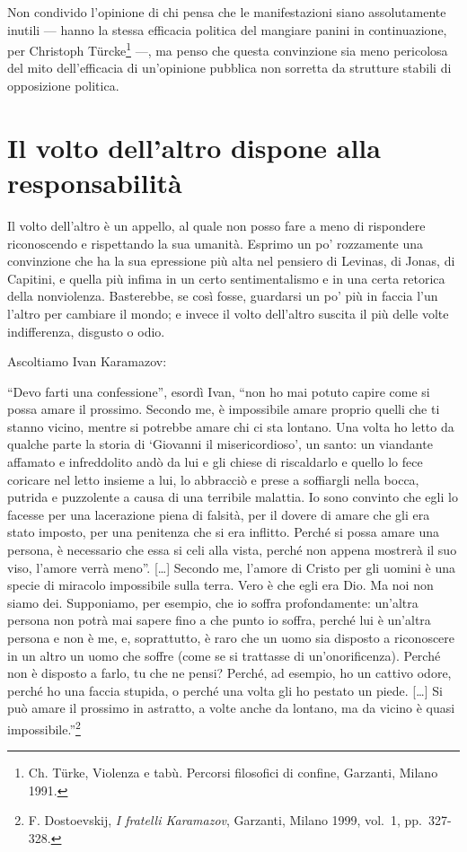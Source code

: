 \documentclass[12pt,oneside,openany]{book}
\begin{document}
Non condivido l'opinione di chi pensa che le manifestazioni siano assolutamente inutili --- hanno la stessa efficacia politica del mangiare panini in continuazione, per Christoph Türcke\footnote{Ch. Türke, Violenza e tabù. Percorsi filosofici di confine, Garzanti, Milano 1991.} ---, ma penso che questa convinzione sia meno pericolosa del mito dell'efficacia di un'opinione pubblica non sorretta da strutture stabili di opposizione politica.

\setcounter{chapter}{10}\addtocounter{chapter}{-1}

\chapter{Il volto dell’altro dispone alla responsabilità}

Il volto dell'altro è un appello, al quale non posso fare a meno di rispondere riconoscendo e rispettando la sua umanità. Esprimo un po' rozzamente una convinzione che ha la sua epressione più alta nel pensiero di Levinas, di Jonas, di Capitini, e quella più infima in un certo sentimentalismo e in una certa retorica della nonviolenza. Basterebbe, se così fosse, guardarsi un po' più in faccia l'un l'altro per cambiare il mondo; e invece il volto dell'altro suscita il più delle volte indifferenza, disgusto o odio.



Ascoltiamo Ivan Karamazov:



``Devo farti una confessione'', esordì Ivan, ``non ho mai potuto capire come si possa amare il prossimo. Secondo me, è impossibile amare proprio quelli che ti stanno vicino, mentre si potrebbe amare chi ci sta lontano. Una volta ho letto da qualche parte la storia di `Giovanni il misericordioso', un santo: un viandante affamato e infreddolito andò da lui e gli chiese di riscaldarlo e quello lo fece coricare nel letto insieme a lui, lo abbracciò e prese a soffiargli nella bocca, putrida e puzzolente a causa di una terribile malattia. Io sono convinto che egli lo facesse per una lacerazione piena di falsità, per il dovere di amare che gli era stato imposto, per una penitenza che si era inflitto. Perché si possa amare una persona, è necessario che essa si celi alla vista, perché non appena mostrerà il suo viso, l'amore verrà meno''. {[}\ldots{]} Secondo me, l'amore di Cristo per gli uomini è una specie di miracolo impossibile sulla terra. Vero è che egli era Dio. Ma noi non siamo dei. Supponiamo, per esempio, che io soffra profondamente: un'altra persona non potrà mai sapere fino a che punto io soffra, perché lui è un'altra persona e non è me, e, soprattutto, è raro che un uomo sia disposto a riconoscere in un altro un uomo che soffre (come se si trattasse di un'onorificenza). Perché non è disposto a farlo, tu che ne pensi? Perché, ad esempio, ho un cattivo odore, perché ho una faccia stupida, o perché una volta gli ho pestato un piede. {[}\ldots{]} Si può amare il prossimo in astratto, a volte anche da lontano, ma da vicino è quasi impossibile.''\footnote{F. Dostoevskij, \emph{I fratelli Karamazov}, Garzanti, Milano 1999, vol.~1, pp.~327-328.}
\end{document}
